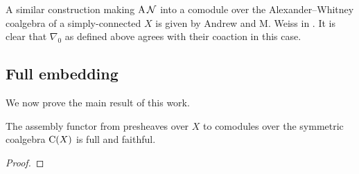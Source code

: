 A similar construction making $\operatorname{A} \mathcal{N}$ into a comodule over the Alexander--Whitney coalgebra of a simply-connected $X$ is given by Andrew and M. Weiss in \cite[Proposition~5.3]{ranicki1990assembly}.
It is clear that $\nabla_0$ as defined above agrees with their coaction in this case.

\subsection{Full embedding} \label{ss:full embedding}

We now prove the main result of this work.

\begin{theorem*}
	The assembly functor from presheaves over $X$ to comodules over the symmetric coalgebra $\operatorname{C}(X)$ is full and faithful.
\end{theorem*}

\begin{proof}
	
\end{proof}